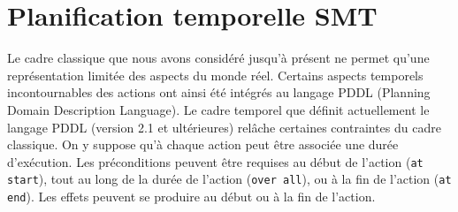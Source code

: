 














\section{Planification temporelle SMT}\label{chap:codages:smt}
%

Le cadre classique que nous avons considéré jusqu'à présent ne permet qu’une représentation limitée des aspects du monde réel. Certains aspects temporels incontournables des actions ont ainsi été intégrés au langage PDDL (Planning Domain Description Language). Le cadre temporel que définit actuellement le langage PDDL (version 2.1 et ultérieures) relâche certaines contraintes du cadre classique. On y suppose qu'à chaque action peut être associée une durée d'exécution. Les préconditions peuvent être requises au début de l'action (\texttt{at start}), tout au long de la durée de l'action (\texttt{over all}), ou à la fin de l'action (\texttt{at end}). Les effets peuvent se produire au début ou à la fin de l'action.


